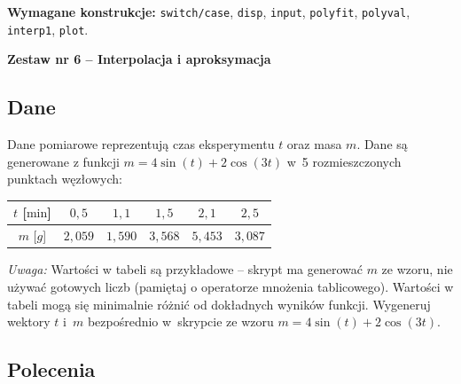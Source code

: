 \documentclass[a4paper,11pt]{article}
\begin{document}
\vspace{0.3cm}
\begin{ramka}
\textbf{Wymagane konstrukcje:}
\texttt{switch/case}, \texttt{disp}, \texttt{input}, \texttt{polyfit}, \texttt{polyval}, \texttt{interp1}, \texttt{plot}.
\end{ramka}

\clearpage
\begin{center}
  {\large\bfseries Zestaw nr 6 \quad -- \quad Interpolacja i aproksymacja}
\end{center}
\hrulefill
\vspace{0.4cm}

\subsection*{Dane}

Dane pomiarowe reprezentują czas eksperymentu $t$ oraz masa $m$.
Dane są generowane z funkcji $m = 4\sin(t) + 2\cos(3t)$ w~5 rozmieszczonych punktach węzłowych:

\begin{center}
\begin{tabular}{c|ccccc}
  \toprule
  $t$ [$\text{min}$] & $0{,}5$ & $1{,}1$ & $1{,}5$ & $2{,}1$ & $2{,}5$ \\
  \midrule
  $m$ [$g$] & $2{,}059$ & $1{,}590$ & $3{,}568$ & $5{,}453$ & $3{,}087$ \\
  \bottomrule
\end{tabular}
\end{center}

\medskip
\textit{Uwaga:} Wartości w tabeli są przykładowe – skrypt ma generować $m$ ze wzoru, nie używać gotowych liczb (pamiętaj o operatorze mnożenia tablicowego). Wartości w tabeli mogą się minimalnie różnić od dokładnych wyników funkcji.
Wygeneruj wektory $t$ i~$m$ bezpośrednio w~skrypcie ze wzoru $m = 4\sin(t) + 2\cos(3t)$.

\subsection*{Polecenia}
\end{document}
